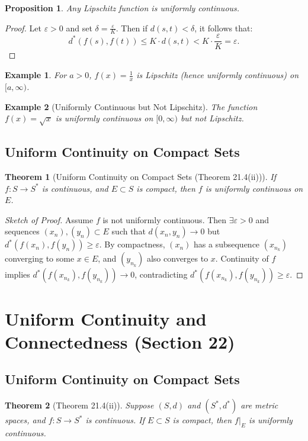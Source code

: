 \documentclass[9pt]{article}
\theoremstyle{definition}
\theoremstyle{plain}
\newtheorem{theorem}{Theorem}
\newtheorem{proposition}{Proposition}
\newtheorem{example}{Example}
\begin{document}
\begin{proposition}
Any Lipschitz function is uniformly continuous.
\end{proposition}

\begin{proof}
Let \( \varepsilon > 0 \) and set \( \delta = \frac{\varepsilon}{K} \). Then if \( d(s, t) < \delta \), it follows that:
\[
d^*(f(s), f(t)) \leq K \cdot d(s, t) < K \cdot \frac{\varepsilon}{K} = \varepsilon.
\]
\end{proof}

\begin{example}
For \( a > 0 \), \( f(x) = \frac{1}{x} \) is Lipschitz (hence uniformly continuous) on \( [a, \infty) \).
\end{example}

\begin{example}[Uniformly Continuous but Not Lipschitz]
The function \( f(x) = \sqrt{x} \) is uniformly continuous on \( [0, \infty) \) but not Lipschitz.
\end{example}

\subsection*{Uniform Continuity on Compact Sets}
\begin{theorem}[Uniform Continuity on Compact Sets (Theorem 21.4(ii))]
If \( f : S \to S^* \) is continuous, and \( E \subset S \) is compact, then \( f \) is uniformly continuous on \( E \).
\end{theorem}

\begin{proof}[Sketch of Proof]
Assume \( f \) is not uniformly continuous. Then \( \exists \varepsilon > 0 \) and sequences \( (x_n), (y_n) \subset E \) such that \( d(x_n, y_n) \to 0 \) but \( d^*(f(x_n), f(y_n)) \geq \varepsilon \). By compactness, \( (x_n) \) has a subsequence \( (x_{n_k}) \) converging to some \( x \in E \), and \( (y_{n_k}) \) also converges to \( x \). Continuity of \( f \) implies \( d^*(f(x_{n_k}), f(y_{n_k})) \to 0 \), contradicting \( d^*(f(x_{n_k}), f(y_{n_k})) \geq \varepsilon \).
\end{proof}
\section*{Uniform Continuity and Connectedness (Section 22)}

\subsection*{Uniform Continuity on Compact Sets}
\begin{theorem}[Theorem 21.4(ii)]
Suppose \( (S, d) \) and \( (S^*, d^*) \) are metric spaces, and \( f : S \to S^* \) is continuous. If \( E \subset S \) is compact, then \( f|_E \) is uniformly continuous.
\end{theorem}
\end{document}
